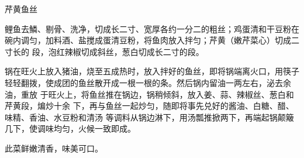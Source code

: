 %
%
%
%
%
%
%
\begin{recipe}{芹黄鱼丝}

\ingredients


\preparation

\step 鲤鱼去鱗、剔骨、洗净，切成长二寸、宽厚各约一分二的粗丝；鸡蛋清和干豆粉在
碗内调匀，加料酒、盐搅成蛋清豆粉，将鱼肉放入拌匀；芹黄（嫩芹菜心）切成二寸长的
段，泡红辣椒切成斜丝，葱白切成长二寸的段。

\step 锅在旺火上放入猪油，烧至五成热时，放入拌好的鱼丝，即将锅端离火口，用筷子
轻轻翻拨，使成团的鱼丝散开成一根一根的条。然后锅内留油一两左右，泌去余油，重放
于旺火上，将鱼丝推在锅边，锅稍倾斜，放入姜、蒜、辣椒丝、葱白和芹黄段，煸炒十余
下，再与鱼丝一起炒匀，随即将事先兑好的酱油、白糖、醋、味精、香油、水豆粉和清汤
等调料从锅边淋下，用汤瓢推掀两下，再端起锅颠簸几下，使调味均匀，火候一致即成。

\features

此菜鲜嫩清香，味美可口。

\end{recipe}

